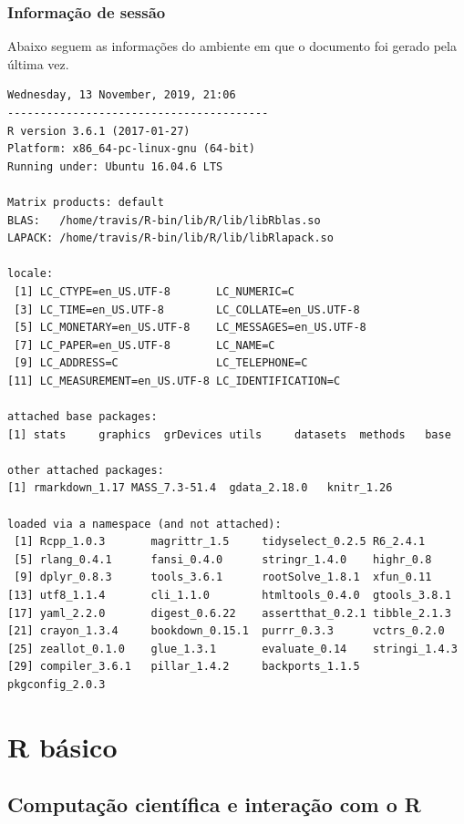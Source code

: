 \documentclass[10pt,a4paper]{book}
\begin{document}
\section*{Informação de sessão}\label{informauxe7uxe3o-de-sessuxe3o}


Abaixo seguem as informações do ambiente em que o documento foi gerado
pela última vez.

\begin{verbatim}
Wednesday, 13 November, 2019, 21:06
----------------------------------------
R version 3.6.1 (2017-01-27)
Platform: x86_64-pc-linux-gnu (64-bit)
Running under: Ubuntu 16.04.6 LTS

Matrix products: default
BLAS:   /home/travis/R-bin/lib/R/lib/libRblas.so
LAPACK: /home/travis/R-bin/lib/R/lib/libRlapack.so

locale:
 [1] LC_CTYPE=en_US.UTF-8       LC_NUMERIC=C              
 [3] LC_TIME=en_US.UTF-8        LC_COLLATE=en_US.UTF-8    
 [5] LC_MONETARY=en_US.UTF-8    LC_MESSAGES=en_US.UTF-8   
 [7] LC_PAPER=en_US.UTF-8       LC_NAME=C                 
 [9] LC_ADDRESS=C               LC_TELEPHONE=C            
[11] LC_MEASUREMENT=en_US.UTF-8 LC_IDENTIFICATION=C       

attached base packages:
[1] stats     graphics  grDevices utils     datasets  methods   base     

other attached packages:
[1] rmarkdown_1.17 MASS_7.3-51.4  gdata_2.18.0   knitr_1.26    

loaded via a namespace (and not attached):
 [1] Rcpp_1.0.3       magrittr_1.5     tidyselect_0.2.5 R6_2.4.1        
 [5] rlang_0.4.1      fansi_0.4.0      stringr_1.4.0    highr_0.8       
 [9] dplyr_0.8.3      tools_3.6.1      rootSolve_1.8.1  xfun_0.11       
[13] utf8_1.1.4       cli_1.1.0        htmltools_0.4.0  gtools_3.8.1    
[17] yaml_2.2.0       digest_0.6.22    assertthat_0.2.1 tibble_2.1.3    
[21] crayon_1.3.4     bookdown_0.15.1  purrr_0.3.3      vctrs_0.2.0     
[25] zeallot_0.1.0    glue_1.3.1       evaluate_0.14    stringi_1.4.3   
[29] compiler_3.6.1   pillar_1.4.2     backports_1.1.5  pkgconfig_2.0.3 
\end{verbatim}

\part{R básico}\label{part-r-buxe1sico}

\chapter{Computação científica e interação com o
R}\label{computauxe7uxe3o-cientuxedfica-e-interauxe7uxe3o-com-o-r}
\end{document}
